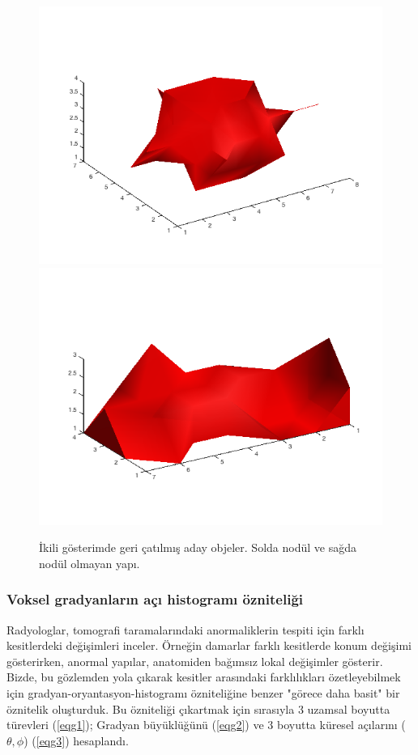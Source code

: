 \documentclass[conference]{IEEEtran}
\begin{document}
\begin{figure}[tb]
\centering
\includegraphics[scale=0.2]{figs/ex_nod.png}
\includegraphics[scale=0.2]{figs/ex_ves.png}
\caption{İkili gösterimde geri çatılmış aday objeler. Solda nodül ve sağda nodül olmayan yapı.}
\label{fig3}
\end{figure}

\subsubsection{Voksel gradyanların açı histogramı özniteliği}
Radyologlar, tomografi taramalarındaki anormaliklerin tespiti için farklı kesitlerdeki değişimleri inceler. Örneğin damarlar farklı kesitlerde konum değişimi gösterirken, anormal yapılar, anatomiden bağımsız lokal değişimler gösterir. Bizde, bu gözlemden yola çıkarak kesitler arasındaki farklılıkları özetleyebilmek için gradyan-oryantasyon-histogramı \cite{dalal2005} özniteliğine benzer "görece daha basit" bir öznitelik oluşturduk. Bu özniteliği çıkartmak için sırasıyla 3 uzamsal boyutta türevleri (\ref{eqg1});
Gradyan büyüklüğünü (\ref{eqg2}) ve 3 boyutta küresel açılarını ($\theta, \phi$) (\ref{eqg3}) hesaplandı.
\end{document}
